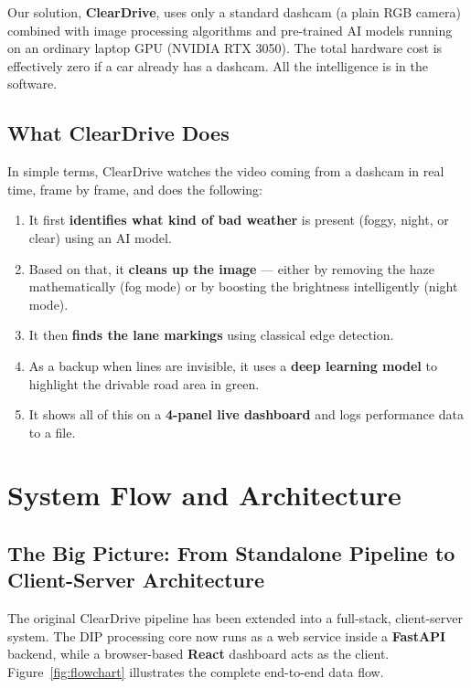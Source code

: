 \documentclass[12pt, a4paper]{article}
\begin{document}
Our solution, \textbf{ClearDrive}, uses only a standard dashcam (a plain
RGB camera) combined with image processing algorithms and pre-trained AI
models running on an ordinary laptop GPU (NVIDIA RTX 3050). The total hardware
cost is effectively zero if a car already has a dashcam. All the intelligence
is in the software.

\subsection{What ClearDrive Does}

In simple terms, ClearDrive watches the video coming from a dashcam in real
time, frame by frame, and does the following:

\begin{enumerate}
  \item It first \textbf{identifies what kind of bad weather} is present
  (foggy, night, or clear) using an AI model.
  \item Based on that, it \textbf{cleans up the image} — either by removing
  the haze mathematically (fog mode) or by boosting the brightness intelligently
  (night mode).
  \item It then \textbf{finds the lane markings} using classical edge detection.
  \item As a backup when lines are invisible, it uses a \textbf{deep learning
  model} to highlight the drivable road area in green.
  \item It shows all of this on a \textbf{4-panel live dashboard} and logs
  performance data to a file.
\end{enumerate}

\section{System Flow and Architecture}

\subsection{The Big Picture: From Standalone Pipeline to Client-Server Architecture}

The original ClearDrive pipeline has been extended into a full-stack,
client-server system. The DIP processing core now runs as a web service inside
a \textbf{FastAPI} backend, while a browser-based \textbf{React} dashboard
acts as the client. Figure~\ref{fig:flowchart} illustrates the complete
end-to-end data flow.
\end{document}
